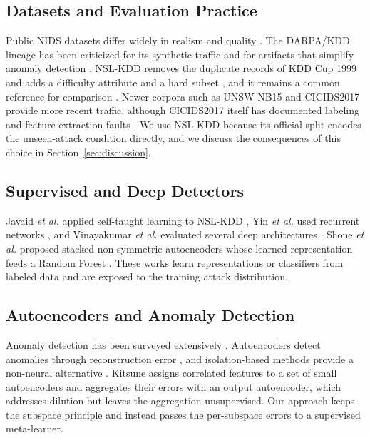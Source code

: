 \documentclass[journal]{IEEEtran}
\newcommand{\etal}{\textit{et al.}}
\begin{document}
\subsection{Datasets and Evaluation Practice}
Public NIDS datasets differ widely in realism and quality \cite{ring2019}. The DARPA/KDD lineage has been criticized for its synthetic traffic and for artifacts that simplify anomaly detection \cite{mchugh2000,mahoney2003}. NSL-KDD removes the duplicate records of KDD Cup 1999 and adds a difficulty attribute and a hard subset \cite{tavallaee2009}, and it remains a common reference for comparison \cite{dhanabal2015}. Newer corpora such as UNSW-NB15 \cite{moustafa2015} and CICIDS2017 \cite{sharafaldin2018} provide more recent traffic, although CICIDS2017 itself has documented labeling and feature-extraction faults \cite{engelen2021}. We use NSL-KDD because its official split encodes the unseen-attack condition directly, and we discuss the consequences of this choice in Section~\ref{sec:discussion}.

\subsection{Supervised and Deep Detectors}
Javaid \etal{} applied self-taught learning to NSL-KDD \cite{javaid2016}, Yin \etal{} used recurrent networks \cite{yin2017}, and Vinayakumar \etal{} evaluated several deep architectures \cite{vinayakumar2019}. Shone \etal{} proposed stacked non-symmetric autoencoders whose learned representation feeds a Random Forest \cite{shone2018}. These works learn representations or classifiers from labeled data and are exposed to the training attack distribution.

\subsection{Autoencoders and Anomaly Detection}
Anomaly detection has been surveyed extensively \cite{chandola2009,pang2021,ruff2021}. Autoencoders \cite{hinton2006,vincent2008} detect anomalies through reconstruction error \cite{sakurada2014}, and isolation-based methods provide a non-neural alternative \cite{liu2008}. Kitsune \cite{mirsky2018} assigns correlated features to a set of small autoencoders and aggregates their errors with an output autoencoder, which addresses dilution but leaves the aggregation unsupervised. Our approach keeps the subspace principle and instead passes the per-subspace errors to a supervised meta-learner.
\end{document}
